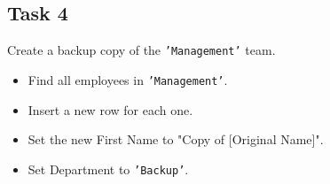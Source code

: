 \documentclass[12pt,a4paper]{article}
\newif\ifshowsolutions
\begin{document}
\ifshowsolutions
\textbf{Solution:}
\begin{lstlisting}[language=SQL]
DO $$ 
DECLARE
    r RECORD;
    v_band_a INT := 0;
    v_band_b INT := 0;
    v_band_c INT := 0;
BEGIN
    FOR r IN SELECT salary FROM employees LOOP
        IF r.salary > 15000 THEN
            v_band_a := v_band_a + 1;
        ELSIF r.salary >= 10000 THEN
            v_band_b := v_band_b + 1;
        ELSE
            v_band_c := v_band_c + 1;
        END IF;
    END LOOP;

    RAISE NOTICE 'Band A: %, Band B: %, Band C: %', v_band_a, v_band_b, v_band_c;
END $$;
\end{lstlisting}
\fi

\subsection*{Task 4}
Create a backup copy of the \texttt{'Management'} team.
\begin{itemize}
    \item Find all employees in \texttt{'Management'}.
    \item Insert a new row for each one.
    \item Set the new First Name to "Copy of [Original Name]".
    \item Set Department to \texttt{'Backup'}.
\end{itemize}

\ifshowsolutions
\textbf{Solution:}
\begin{lstlisting}[language=SQL]
DO $$ 
DECLARE
    r RECORD;
BEGIN
    FOR r IN SELECT first_name, last_name, salary FROM employees WHERE department = 'Management' LOOP
        
        INSERT INTO employees (first_name, last_name, salary, department)
        VALUES (
            'Copy of ' || r.first_name, 
            r.last_name, 
            r.salary, 
            'Backup'
        );
        
        RAISE NOTICE 'Backed up manager: %', r.first_name;
    END LOOP;
END $$;
\end{lstlisting}
\fi
\end{document}
